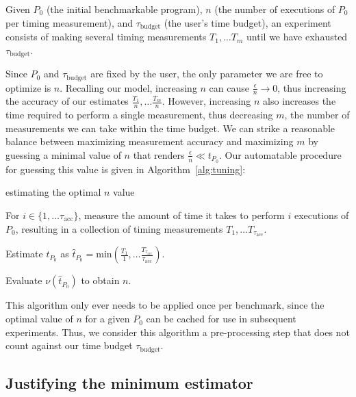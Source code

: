 \documentclass[conference]{IEEEtran}
\begin{document}
Given $P_0$ (the initial benchmarkable program), $n$ (the number of executions of $P_0$ per
timing measurement), and $\tau_{\textrm{budget}}$ (the user's time budget), an experiment
consists of making several timing measurements $T_1, \dots T_m$ until we have exhausted
$\tau_{\textrm{budget}}$.

Since $P_0$ and $\tau_{\textrm{budget}}$ are fixed by the user, the only parameter we are
free to optimize is $n$. Recalling our model, increasing $n$ can cause $\frac{\epsilon}{n}
\to 0$, thus increasing the accuracy of our estimates $\frac{T_1}{n}, \dots \frac{T_m}{n}$.
However, increasing $n$ also increases the time required to perform a single measurement,
thus decreasing $m$, the number of measurements we can take within the time budget. We can
strike a reasonable balance between maximizing measurement accuracy and maximizing $m$ by
guessing a minimal value of $n$ that renders $\frac{\epsilon}{n} \ll t_{P_0}$. Our
automatable procedure for guessing this value is given in Algorithm~\ref{alg:tuning}:

\begin{algorithm}
    \caption{estimating the optimal $n$ value}
    \label{alg:tuning}
    For $i \in \{1, \dots \tau_{\textrm{acc}}\}$, measure the amount of time it takes
    to perform $i$ executions of $P_0$, resulting in a collection of timing measurements
    $T_1, \dots T_{\tau_{\textrm{acc}}}$.

    Estimate $t_{P_0}$ as $\hat{t}_{P_0} = \textrm{min}(\frac{T_1}{1}, \dots \frac{T_{\tau_{\textrm{acc}}}}{\tau_{\textrm{acc}}})$.

    Evaluate $\nu(\hat{t}_{P_0})$ to obtain $n$.
\end{algorithm}

This algorithm only ever needs to be applied once per benchmark, since the optimal value of
$n$ for a given $P_0$ can be cached for use in subsequent experiments. Thus, we consider
this algorithm a pre-processing step that does not count against our time budget
$\tau_{\textrm{budget}}$.

\label{sec:minimum}
\subsection{Justifying the minimum estimator}
\end{document}
